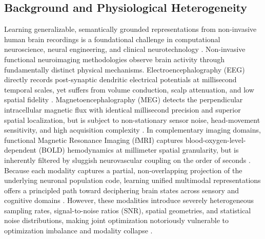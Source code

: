 \documentclass[conference]{IEEEtran}
\begin{document}
\subsection{Background and Physiological Heterogeneity}
Learning generalizable, semantically grounded representations from non-invasive human brain recordings is a foundational challenge in computational neuroscience, neural engineering, and clinical neurotechnology \cite{niedermeyer2005eeg, hamalainen1993meg}. Non-invasive functional neuroimaging methodologies observe brain activity through fundamentally distinct physical mechanisms. Electroencephalography (EEG) directly records post-synaptic dendritic electrical potentials at millisecond temporal scales, yet suffers from volume conduction, scalp attenuation, and low spatial fidelity \cite{niedermeyer2005eeg}. Magnetoencephalography (MEG) detects the perpendicular intracellular magnetic flux with identical millisecond precision and superior spatial localization, but is subject to non-stationary sensor noise, head-movement sensitivity, and high acquisition complexity \cite{hamalainen1993meg}. In complementary imaging domains, functional Magnetic Resonance Imaging (fMRI) captures blood-oxygen-level-dependent (BOLD) hemodynamics at millimeter spatial granularity, but is inherently filtered by sluggish neurovascular coupling on the order of seconds \cite{glover1999fmri}. Because each modality captures a partial, non-overlapping projection of the underlying neuronal population code, learning unified multimodal representations offers a principled path toward deciphering brain states across sensory and cognitive domains \cite{wu2024brainomni}. However, these modalities introduce severely heterogeneous sampling rates, signal-to-noise ratios (SNR), spatial geometries, and statistical noise distributions, making joint optimization notoriously vulnerable to optimization imbalance and modality collapse \cite{peng2022ogmge}.
\end{document}
